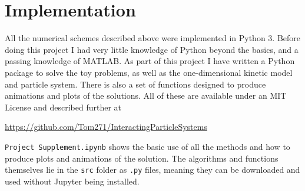 \documentclass[11pt, a4paper, final]{article}
\begin{document}
    
    
    \appendix
    \section{Implementation}\label{app:code}
    All the numerical schemes described above were implemented in Python 3. Before doing this project I had very little knowledge of Python beyond the basics, and a passing knowledge of MATLAB. As part of this project I have written a Python package to solve the toy problems, as well as the one-dimensional kinetic model and particle system. There is also a set of functions designed to produce animations and plots of the solutions. All of these are available under an MIT License and described further at 
    \begin{center}\url{https://github.com/Tom271/InteractingParticleSystems}\end{center}
    \texttt{Project Supplement.ipynb} shows the basic use of all the methods and how to produce plots and animations of the solution. The algorithms and functions themselves lie in the \texttt{src} folder as \texttt{.py} files, meaning they can be downloaded and used without Jupyter being installed.
\end{document}

